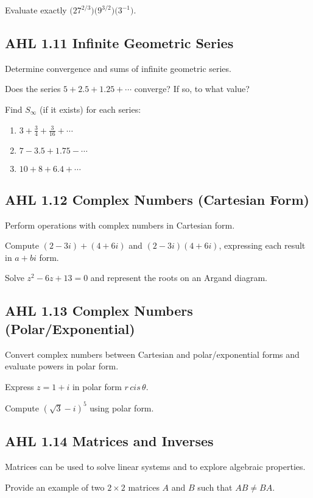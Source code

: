 \documentclass[11pt]{article}
\def\mathrm#1{#1}%
\newcommand{\tocsubsection}[1]{\subsection{#1}}
\newcounter{question}
\begin{document}
\begin{question}
Evaluate exactly $\bigl(27^{2/3}\bigr)\bigl(9^{3/2}\bigr)\bigl(3^{-1}\bigr)$.
\end{question}

\tocsubsection{AHL  1.11  \; Infinite  Geometric  Series}
Determine convergence and sums of infinite geometric series.

\begin{question}
Does the series $5+2.5+1.25+\cdots$ converge?  If so, to what value?
\end{question}

\begin{question}
Find $S_\infty$ (if it exists) for each series:
\begin{enumerate}[label=\alph*)]
\item $3+\tfrac{3}{4}+\tfrac{3}{16}+\cdots$
\item $7-3.5+1.75-\cdots$
\item $10+8+6.4+\cdots$
\end{enumerate}
\end{question}

\tocsubsection{AHL  1.12  \; Complex  Numbers  (Cartesian  Form)}
Perform operations with complex numbers in Cartesian form.

\begin{question}
Compute $(2-3i)+(4+6i)$ and $(2-3i)(4+6i)$, expressing each result in $a+bi$ form.
\end{question}

\begin{question}
Solve $z^2-6z+13=0$ and represent the roots on an Argand diagram.
\end{question}

\tocsubsection{AHL  1.13  \; Complex  Numbers  (Polar/Exponential)}
Convert complex numbers between Cartesian and polar/exponential forms and
evaluate powers in polar form.

\begin{question}
Express $z=1+i$ in polar form $r\,\mathrm{cis}\,\theta$.
\end{question}

\begin{question}
Compute $(\sqrt{3}-i)^5$ using polar form.
\end{question}

\tocsubsection{AHL  1.14  \; Matrices and Inverses}
Matrices can be used to solve linear systems and to explore algebraic properties.

\begin{question}
Provide an example of two $2\times2$ matrices $A$ and $B$ such that $AB\ne BA$.
\end{question}
\end{document}
